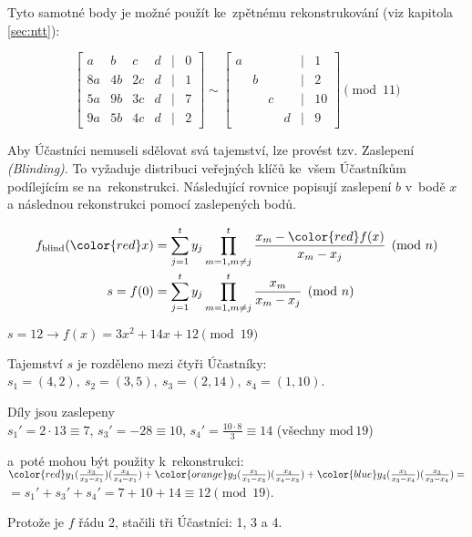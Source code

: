 Tyto samotné body je možné použít ke~zpětnému rekonstrukování (viz kapitola \ref{sec:ntt}):

$$\left[\begin{matrix}
 a &  b &  c & d & | & 0 \\
8a & 4b & 2c & d & | & 1 \\
5a & 9b & 3c & d & | & 7 \\
9a & 5b & 4c & d & | & 2
\end{matrix}\right] \sim \left[\begin{matrix}
 a &    &    &   & | & 1 \\
   &  b &    &   & | & 2 \\
   &    &  c &   & | & 10 \\
   &    &    & d & | & 9
\end{matrix}\right] \pmod {11}$$

Aby Účastníci nemuseli sdělovat svá tajemství, lze provést tzv. Zaslepení \emph{(Blinding)}.
To vyžaduje distribuci veřejných klíčů ke~všem Účastníkům podílejícím se na~rekonstrukci.
Následující rovnice popisují zaslepení $b$ v~bodě $x$ a následnou rekonstrukci pomocí zaslepených bodů.

\begin{align*}
    f_\text{blind}({\color{red}x}) &= \sum_{j=1}^t y_j \prod_{m=1, m \neq j}^t \frac{x_m - {\color{red}f(x)}}{x_m - x_j} \pmod n
    \\
    s = f(0) &= \sum_{j=1}^t y_j \prod_{m=1, m \neq j}^t \frac{x_m}{x_m - x_j} \pmod n
\end{align*}

\begin{mdframed}
$s=12 \rightarrow f(x) = 3x^2 + 14x + 12 \pmod {19}$

Tajemství $s$ je rozděleno mezi čtyři Účastníky:\\
$s_1 = (4, 2),\ s_2=(3, 5),\ s_3=(2, 14),\ s_4=(1, 10)$.

Díly jsou zaslepeny\\
$s_1' = 2 \cdot 13 \equiv 7$, $s_3' = -28 \equiv 10$, $s_4' = \frac{10 \cdot 8}{3} \equiv 14$ (všechny $\text{mod}\, {19}$)

a~poté mohou být použity k~rekonstrukci:\\
${\color{red} y_1(\frac{x_3}{x_3-x_1})(\frac{x_4}{x_4-x_1})} + {\color{orange} y_3(\frac{x_1}{x_1-x_3})(\frac{x_4}{x_4-x_3})} + {\color{blue} y_4(\frac{x_1}{x_3-x_4})(\frac{x_3}{x_3-x_4})} =$\\
$= s_1' + s_3' + s_4' = 7 + 10 + 14 \equiv 12 \pmod{19}$.

Protože je $f$ řádu 2, stačili tři Účastníci: 1, 3 a 4.
\end{mdframed}


